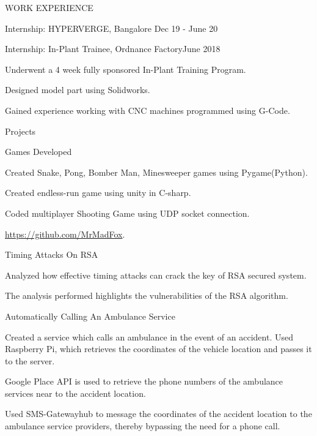 \documentclass{resume} %
\begin{document}
\begin{rSection}{ WORK EXPERIENCE }
\begin{rSubsection}{ Internship: HYPERVERGE, Bangalore} {Dec 19 - June 20}{}
\end{rSubsection}

\begin{rSubsection}{ Internship: In-Plant Trainee, Ordnance Factory}{June 2018}{}

    \item Underwent a 4 week fully sponsored In-Plant Training Program.
    \item Designed model part using Solidworks.
    \item Gained experience working with CNC machines programmed using G-Code.

\end{rSubsection}

\end{rSection}

\begin{rSection}{Projects}

\begin{rSubsection}{ Games Developed}{}{}

\item Created Snake, Pong, Bomber Man, Minesweeper games using Pygame(Python).
\item Created endless-run game using unity in C-sharp.
\item Coded multiplayer Shooting Game using UDP socket connection.
\item  \url{https://github.com/MrMadFox}.

\end{rSubsection}

\begin{rSubsection}{ Timing Attacks On RSA}{}{}

\item Analyzed how effective timing attacks can crack the key of RSA secured system.
\item The analysis performed highlights the vulnerabilities of the RSA algorithm.

\end{rSubsection}


\begin{rSubsection}{ Automatically Calling An Ambulance Service}{}{}

\item Created a service which calls an ambulance in the event of an accident. Used Raspberry Pi, which retrieves the coordinates of the vehicle location and passes it to the server.
\item Google Place API is used to retrieve the phone numbers of the ambulance services near to the accident location.
\item Used SMS-Gatewayhub to message the coordinates of the accident location to the ambulance service providers, thereby bypassing the need for a phone call.


\end{rSubsection}
\end{rSection}
\end{document}
